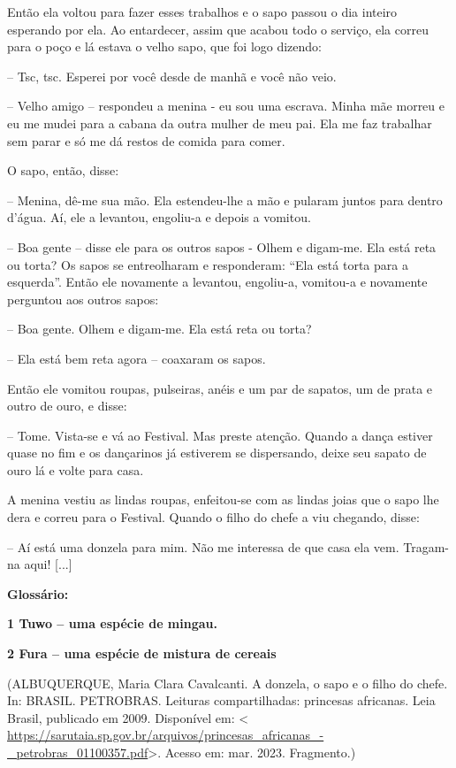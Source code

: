 Então ela voltou para fazer esses trabalhos e o sapo passou o dia
inteiro esperando por ela. Ao entardecer, assim que acabou todo o
serviço, ela correu para o poço e lá estava o velho sapo, que foi logo
dizendo:

-- Tsc, tsc. Esperei por você desde de manhã e você não veio.

-- Velho amigo -- respondeu a menina - eu sou uma escrava. Minha mãe
morreu e eu me mudei para a cabana da outra mulher de meu pai. Ela me
faz trabalhar sem parar e só me dá restos de comida para comer.

O sapo, então, disse:

-- Menina, dê-me sua mão. Ela estendeu-lhe a mão e pularam juntos para
dentro d'água. Aí, ele a levantou, engoliu-a e depois a vomitou.

-- Boa gente -- disse ele para os outros sapos - Olhem e digam-me. Ela
está reta ou torta? Os sapos se entreolharam e responderam: ``Ela está
torta para a esquerda''. Então ele novamente a levantou, engoliu-a,
vomitou-a e novamente perguntou aos outros sapos:

-- Boa gente. Olhem e digam-me. Ela está reta ou torta?

-- Ela está bem reta agora -- coaxaram os sapos.

Então ele vomitou roupas, pulseiras, anéis e um par de sapatos, um de
prata e outro de ouro, e disse:

-- Tome. Vista-se e vá ao Festival. Mas preste atenção. Quando a dança
estiver quase no fim e os dançarinos já estiverem se dispersando, deixe
seu sapato de ouro lá e volte para casa.

A menina vestiu as lindas roupas, enfeitou-se com as lindas joias que o
sapo lhe dera e correu para o Festival. Quando o filho do chefe a viu
chegando, disse:

-- Aí está uma donzela para mim. Não me interessa de que casa ela vem.
Tragam-na aqui! {[}...{]}

\textbf{Glossário:}

\textbf{1 Tuwo -- uma espécie de mingau.}

\textbf{2 Fura -- uma espécie de mistura de cereais}

(ALBUQUERQUE, Maria Clara Cavalcanti. A donzela, o sapo e o filho do
chefe. In: BRASIL. PETROBRAS. Leituras compartilhadas: princesas
africanas. Leia Brasil, publicado em 2009. Disponível em: \textless{}
\url{https://sarutaia.sp.gov.br/arquivos/princesas_africanas_-_petrobras_01100357.pdf}\textgreater.
Acesso em: mar. 2023. Fragmento.)

